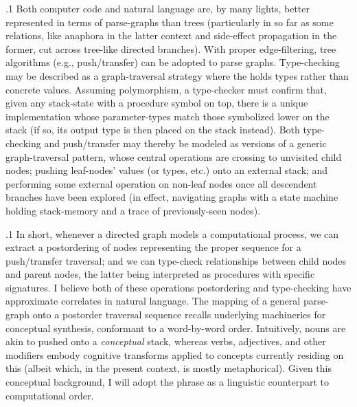 \documentclass[11pt, twocolumn]{article}
\begin{document}
\p.1{%
\:\+Both computer code and natural language are, by many lights,
better represented in terms of parse-graphs than trees
(particularly in so far as some relations, like anaphora in the latter context
and side-effect propagation in the former, cut across tree-like
directed branches). \>  With proper edge-filtering, tree 
algorithms (e.g., push/transfer) can be adopted to parse graphs. \> 
Type-checking may be described as a graph-traversal
strategy where the  holds types rather
than concrete values. \>  Assuming
polymorphism, \pgl{}a type-checker
must confirm that, given any stack-state with a
procedure symbol on top, there is a unique implementation
whose parameter-types match those symbolized lower on the stack
(if so, its output type is then placed on the stack
instead). \>  Both type-checking
and push/transfer may thereby be modeled
as versions of a generic graph-traversal pattern, whose
central operations are crossing to unvisited child nodes;
pushing leaf-nodes' values (or types, etc.) onto an
external stack; and performing some external operation
on non-leaf nodes once all descendent branches have been explored
(in effect, navigating graphs with a state
machine holding stack-memory and a trace of previously-seen nodes).\<\;
}%

\p.1{%
\:\+In short, whenever a directed graph models a computational
process, we can extract a postordering of nodes
representing the proper sequence for a push/transfer traversal;
and we can type-check relationships between
child nodes and parent nodes, the latter being interpreted
as procedures with specific signatures. \>  I believe
both of these operations \mdash{} postordering and type-checking
\mdash{} have approximate correlates in natural language. \> 
The mapping of a general parse-graph onto
a postorder traversal sequence recalls
underlying machineries for conceptual synthesis,
conformant to a word-by-word  order. \> 
Intuitively, nouns are akin to
 pushed onto a \textit{conceptual} stack,
whereas verbs, adjectives, and other modifiers
embody cognitive transforms applied to concepts
currently residing on this 
(albeit which, in the present context, is mostly metaphorical). \> 
Given this conceptual background, I will adopt the
phrase  as a linguistic
counterpart to computational  order.\<\;
}%
\end{document}

